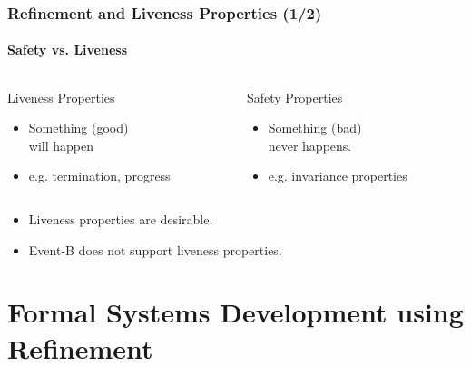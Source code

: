 \begin{frame}
  \frametitle{Refinement and Liveness Properties (1/2)}
  \framesubtitle{Safety vs. Liveness}

  \begin{columns}
    \begin{column}{0.45\textwidth}
      \begin{block}{Liveness Properties}
        \begin{itemize}
        \item Something (good) \\
          \quad \alert{will happen}
          \medskip
        \item e.g. termination, progress
        \end{itemize}
      \end{block}
    \end{column}
    \begin{column}{0.45\textwidth}
      \begin{block}{Safety Properties}
        \begin{itemize}
        \item Something (bad) \\
          \quad \alert{never happens}.
          \medskip
        \item e.g. invariance properties
        \end{itemize}
      \end{block}
    \end{column}
  \end{columns}

  \vspace{2ex}

  \pause
  \begin{itemize}
  \item Liveness properties are \alert{desirable}. \pause
    \smallskip
    \begin{center}
    \end{center}
    \pause
    \medskip
  \item Event-B does not support liveness properties.
  \end{itemize}

\end{frame}

\section{Formal Systems Development using Refinement}
\label{sec:form-syst-devel}

